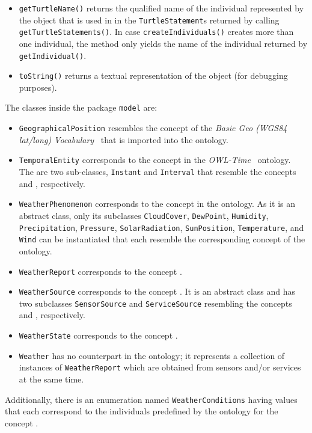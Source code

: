 \begin{itemize}
  \item \texttt{getTurtleName()} returns the qualified name of the individual represented by the object that is used in in the \texttt{TurtleStatement}s returned by calling \texttt{get\hspace{0pt}Turtle\hspace{0pt}Statements()}. In case \texttt{createIndividuals()} creates more than one individual, the method only yields the name of the individual returned by \texttt{getIndividual()}.
  
  \item \texttt{toString()} returns a textual representation of the object (for debugging purposes).
\end{itemize}

The classes inside the package \texttt{model} are:
\begin{itemize}
  \item \texttt{GeographicalPosition} resembles the concept  of the \emph{Basic Geo (\acs{WGS84} lat/long) Vocabulary}~\cite{wgs84_vocabulary} that is imported into the \smarthomeweather ontology.
  
  \item \texttt{TemporalEntity} corresponds to the concept  in the \emph{OWL-Time}~\cite{owl-time} ontology. The are two sub-classes, \texttt{Instant} and \texttt{Interval} that resemble the concepts  and , respectively.
  
  \item \texttt{WeatherPhenomenon} corresponds to the concept  in the \smarthomeweather ontology. As it is an abstract class, only its subclasses \texttt{CloudCover}, \texttt{Dew\-Point}, \texttt{Humidity}, \texttt{Precipitation}, \texttt{Pressure}, \texttt{SolarRadiation}, \texttt{Sun\-Po\-si\-tion}, \texttt{Temperature}, and \texttt{Wind} can be instantiated that each resemble the corresponding concept of the ontology.
  
  \item \texttt{WeatherReport} corresponds to the concept .
  
  \item \texttt{WeatherSource} corresponds to the concept . It is an abstract class and has two subclasses \texttt{SensorSource} and \texttt{ServiceSource} resembling the concepts  and , respectively.
  
  \item \texttt{WeatherState} corresponds to the concept .
  
  \item \texttt{Weather} has no counterpart in the ontology; it represents a collection of instances of \texttt{WeatherReport} which are obtained from sensors and/or services at the same time.
\end{itemize}
% 
Additionally, there is an enumeration named \texttt{WeatherConditions} having values that each correspond to the individuals predefined by the ontology for the concept .

